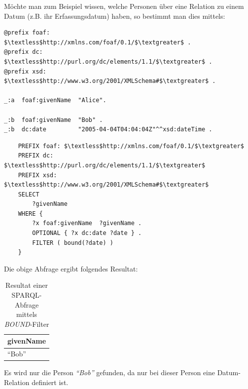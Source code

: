 Möchte man zum Beispiel wissen, welche Personen über eine Relation zu einem Datum (z.B. ihr Erfassungsdatum) haben, so bestimmt man dies mittels:
\begin{lstlisting}
@prefix foaf:        $\textless$http://xmlns.com/foaf/0.1/$\textgreater$ .
@prefix dc:          $\textless$http://purl.org/dc/elements/1.1/$\textgreater$ .
@prefix xsd:          $\textless$http://www.w3.org/2001/XMLSchema#$\textgreater$ .

_:a  foaf:givenName  "Alice".

_:b  foaf:givenName  "Bob" .
_:b  dc:date         "2005-04-04T04:04:04Z"^^xsd:dateTime .
\end{lstlisting}

\begin{lstlisting}
    PREFIX foaf: $\textless$http://xmlns.com/foaf/0.1/$\textgreater$
    PREFIX dc:   $\textless$http://purl.org/dc/elements/1.1/$\textgreater$
    PREFIX xsd:   $\textless$http://www.w3.org/2001/XMLSchema#$\textgreater$
    SELECT
        ?givenName
    WHERE {
        ?x foaf:givenName  ?givenName .
        OPTIONAL { ?x dc:date ?date } .
        FILTER ( bound(?date) )
    }
\end{lstlisting}

Die obige Abfrage ergibt folgendes Resultat:
\noindent\hspace*{15mm}
\begin{table}[h]
    \centering
    \begin{tabular}{|l|}
        \hline
        \multicolumn{1}{|c|}{\textbf{givenName}} \\ \hline
        ``Bob''                    \\ \hline
    \end{tabular}
    \caption{Resultat einer SPARQL-Abfrage mittels \textit{BOUND}-Filter\protect\footnotemark}
\end{table}

Es wird nur die Person \textit{``Bob''} gefunden, da nur bei dieser Person eine Datum-Relation definiert ist.

